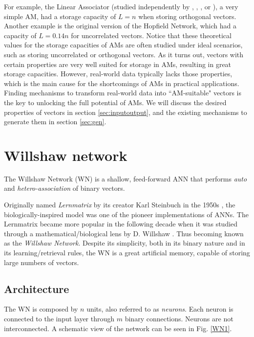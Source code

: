 \documentclass[runningheads]{llncs}
\begin{document}
For example, the Linear Associator (studied independently by \cite{anderson1968memory}, \cite{kohonen1972correlation}, \cite{anderson1972simple}, or \cite{nakano1972associatron}), a very simple AM, had a storage capacity of $L=n$ when storing orthogonal vectors. Another example is the original version of the Hopfield Network, which had a capacity of $L = 0.14n$ for uncorrelated vectors. 
Notice that these theoretical values for the storage capacities of AMs are often studied under ideal scenarios, such as storing uncorrelated or orthogonal vectors. As it turns out, vectors with certain properties are very well suited for storage in AMs, resulting in great storage capacities. However, real-world data typically lacks those properties, which is the main cause for the shortcomings of AMs in practical applications. Finding mechanisms to transform real-world data into ``AM-suitable" vectors is the key to unlocking the full potential of AMs. We will discuss the desired properties of vectors in section \ref{sec:inputoutput}, and the existing mechanisms to generate them in section \ref{sec:gen}.


\section{Willshaw network}
\label{sec:wn}
The Willshaw Network (WN) \cite{willshaw1969non} is a shallow, feed-forward ANN that performs \textit{auto} and \textit{hetero-association} of binary vectors.

Originally named \textit{Lernmatrix} by its creator Karl Steinbuch in the 1950s \cite{steinbuch1961lernmatrix}, the biologically-inspired model was one of the pioneer implementations of ANNs.
The Lernmatrix became more popular in the following decade when it was studied through a mathematical/biological lens by D. Willshaw \cite{willshaw1969non}. Thus becoming known as the \textit{Willshaw Network}. Despite its simplicity, both in its binary nature and in its learning/retrieval rules, the WN is a great artificial memory, capable of storing large numbers of vectors.

\subsection{Architecture}
\label{sec:wn_arch}
The WN is composed by $n$ units, also referred to as \textit{neurons}. Each neuron is connected to the input layer through $m$ binary connections. Neurons are not interconnected. A schematic view of the network can be seen in Fig. \ref{WN1}.
\end{document}
